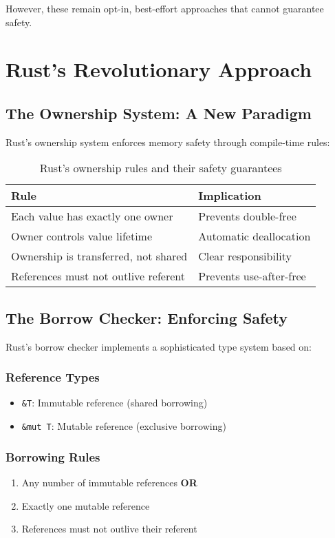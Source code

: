 \documentclass[11pt]{article}
\begin{document}
However, these remain opt-in, best-effort approaches that cannot guarantee safety.

\section{Rust's Revolutionary Approach}

\subsection{The Ownership System: A New Paradigm}

Rust's ownership system enforces memory safety through compile-time rules:

\begin{table}[h]
\centering
\begin{tabular}{@{}ll@{}}
\toprule
\textbf{Rule} & \textbf{Implication} \\
\midrule
Each value has exactly one owner & Prevents double-free \\
Owner controls value lifetime & Automatic deallocation \\
Ownership is transferred, not shared & Clear responsibility \\
References must not outlive referent & Prevents use-after-free \\
\bottomrule
\end{tabular}
\caption{Rust's ownership rules and their safety guarantees}
\label{tab:ownership}
\end{table}

\subsection{The Borrow Checker: Enforcing Safety}

Rust's borrow checker implements a sophisticated type system based on:

\subsubsection{Reference Types}
\begin{itemize}
    \item \texttt{\&T}: Immutable reference (shared borrowing)
    \item \texttt{\&mut T}: Mutable reference (exclusive borrowing)
\end{itemize}

\subsubsection{Borrowing Rules}
\begin{enumerate}
    \item Any number of immutable references \textbf{OR}
    \item Exactly one mutable reference
    \item References must not outlive their referent
\end{enumerate}
\end{document}
